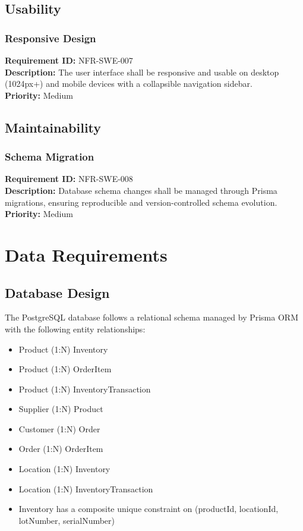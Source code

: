 \documentclass[12pt,a4paper]{report}
\begin{document}
\section{Usability}

\subsection{Responsive Design}
\noindent\textbf{Requirement ID:} NFR-SWE-007\\
\textbf{Description:} The user interface shall be responsive and usable on desktop (1024px+) and mobile devices with a collapsible navigation sidebar.\\
\textbf{Priority:} Medium

\section{Maintainability}

\subsection{Schema Migration}
\noindent\textbf{Requirement ID:} NFR-SWE-008\\
\textbf{Description:} Database schema changes shall be managed through Prisma migrations, ensuring reproducible and version-controlled schema evolution.\\
\textbf{Priority:} Medium

\chapter{Data Requirements}

\section{Database Design}
The PostgreSQL database follows a relational schema managed by Prisma ORM with the following entity relationships:
\begin{itemize}
    \item Product (1:N) Inventory
    \item Product (1:N) OrderItem
    \item Product (1:N) InventoryTransaction
    \item Supplier (1:N) Product
    \item Customer (1:N) Order
    \item Order (1:N) OrderItem
    \item Location (1:N) Inventory
    \item Location (1:N) InventoryTransaction
    \item Inventory has a composite unique constraint on (productId, locationId, lotNumber, serialNumber)
\end{itemize}
\end{document}
